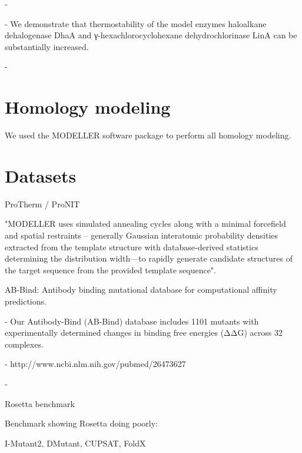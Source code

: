   -

  - We demonstrate that thermostability of the model enzymes haloalkane dehalogenase DhaA and γ-hexachlorocyclohexane dehydrochlorinase LinA can be substantially increased.

  - \cite{bednar_fireprot:_2015}




\section{Homology modeling}

We used the MODELLER software package to perform all homology modeling.





\section{Datasets}

ProTherm / ProNIT \cite{Zeng2011} \cite{kumar_protherm_2006}

"MODELLER uses simulated annealing cycles along with a minimal forcefield and spatial restraints -- generally Gaussian interatomic probability densities extracted from the template structure with database-derived statistics determining the distribution width—to rapidly generate candidate structures of the target sequence from the provided template sequence".


AB-Bind: Antibody binding mutational database for computational affinity predictions.

  - Our Antibody-Bind (AB-Bind) database includes 1101 mutants with experimentally determined changes in binding free energies (ΔΔG) across 32 complexes.

  - http://www.ncbi.nlm.nih.gov/pubmed/26473627

  - \cite{sirin_ab-bind:_2016}


Rosetta benchmark \cite{o_conchuir_web_2015}

Benchmark showing Rosetta doing poorly: \cite{potapov_assessing_2009}

I-Mutant2, DMutant, CUPSAT, FoldX \cite{khan_performance_2010}
